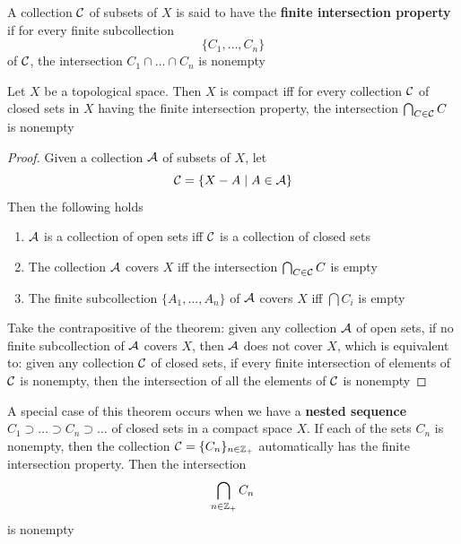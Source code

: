 \documentclass[11pt]{article}
\begin{document}
\begin{definition}[]
A collection \(\mathcal{C}\)  of subsets of \(X\) is said to have the \textbf{finite intersection property} if for
every finite subcollection
\begin{equation*}
\{C_1,\dots,C_n\}
\end{equation*}
of \(\mathcal{C}\), the intersection \(C_1\cap\dots\cap C_n\) is nonempty
\end{definition}

\begin{theorem}[]
\label{thm26.9}
Let \(X\) be a topological space. Then \(X\) is compact iff for every collection \(\mathcal{C}\) of closed
sets in \(X\) having the finite intersection property, the intersection \(\bigcap_{C\in\mathcal{C}}C\) is nonempty
\end{theorem}

\begin{proof}
Given a collection \(\mathcal{A}\) of subsets of \(X\), let
\begin{equation*}
\mathcal{C}=\{X-A\mid A\in\mathcal{A}\}
\end{equation*}
Then the following holds
\begin{enumerate}
\item \(\mathcal{A}\) is a collection of open sets iff \(\mathcal{C}\) is a collection of closed sets
\item The collection \(\mathcal{A}\) covers \(X\) iff the intersection \(\bigcap_{C\in\mathcal{C}}C\) is empty
\item The finite subcollection \(\{A_1,\dots,A_n\}\) of \(\mathcal{A}\) covers \(X\) iff \(\bigcap C_i\) is empty
\end{enumerate}


Take the contrapositive of the theorem: given any collection \(\mathcal{A}\) of open sets, if no finite
subcollection of \(\mathcal{A}\) covers \(X\), then \(\mathcal{A}\) does not cover \(X\), which is equivalent to:
given any collection \(\mathcal{C}\) of closed sets, if every finite intersection of elements of \(\mathcal{C}\) is
nonempty, then the intersection of all the elements of \(\mathcal{C}\) is nonempty
\end{proof}

A special case of this theorem occurs when we have a \textbf{nested sequence} \(C_1\supset\dots\supset C_n\supset\dots\) of closed
sets in a compact space \(X\). If each of the sets \(C_n\) is nonempty, then the
collection \(\mathcal{C}=\{C_n\}_{n\in\mathbb{Z}_+}\) automatically has the finite intersection property. Then the
intersection
\begin{equation*}
\bigcap_{n\in\mathbb{Z}_+}C_n
\end{equation*}
is nonempty
\end{document}
